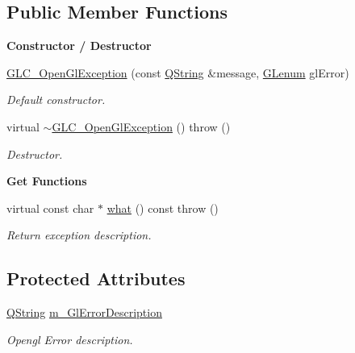 \subsection*{Public Member Functions}
\begin{Indent}{\bf Constructor / Destructor}\par
\begin{DoxyCompactItemize}
\item 
\hyperlink{class_g_l_c___open_gl_exception_ad96ba4e6209251cf4ab28dd65464b1ec}{G\-L\-C\-\_\-\-Open\-Gl\-Exception} (const \hyperlink{group___u_a_v_objects_plugin_gab9d252f49c333c94a72f97ce3105a32d}{Q\-String} \&message, \hyperlink{glext_8h_a508b2dec21679e2e346cad3e0d1969bf}{G\-Lenum} gl\-Error)
\begin{DoxyCompactList}\small\item\em Default constructor. \end{DoxyCompactList}\item 
virtual \hyperlink{class_g_l_c___open_gl_exception_a02416337a3b1621908b0e378548a115a}{$\sim$\-G\-L\-C\-\_\-\-Open\-Gl\-Exception} ()  throw ()
\begin{DoxyCompactList}\small\item\em Destructor. \end{DoxyCompactList}\end{DoxyCompactItemize}
\end{Indent}
\begin{Indent}{\bf Get Functions}\par
\begin{DoxyCompactItemize}
\item 
virtual const char $\ast$ \hyperlink{class_g_l_c___open_gl_exception_a123a42319ba49afa86ae2840a8398ae4}{what} () const   throw ()
\begin{DoxyCompactList}\small\item\em Return exception description. \end{DoxyCompactList}\end{DoxyCompactItemize}
\end{Indent}
\subsection*{Protected Attributes}
\begin{DoxyCompactItemize}
\item 
\hyperlink{group___u_a_v_objects_plugin_gab9d252f49c333c94a72f97ce3105a32d}{Q\-String} \hyperlink{class_g_l_c___open_gl_exception_a26cbce3da6e8542a047c657e2bf4c21a}{m\-\_\-\-Gl\-Error\-Description}
\begin{DoxyCompactList}\small\item\em Opengl Error description. \end{DoxyCompactList}\end{DoxyCompactItemize}


